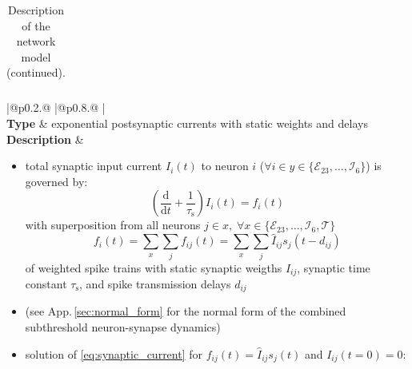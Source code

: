 \documentclass[10pt,a4paper,twoside,american]{article}
\theoremstyle{definitionstyle}
\newcommand{\diff}{\ensuremath{\text{d}}}
\newcommand{\tauS}{\tau_\text{s}}
\begin{document}
\begin{table}[H]
\begin{tabular}{
  |@{\hspace*{\marg}}p{}@{\hspace*{\marg}}
  |@{\hspace*{\marg}}p{}@{\hspace*{\marg}}
  |}
\end{tabular}
\caption{Description of the network model (continued).}
\label{tab:model_description_2}
\end{table}
\clearpage
\begin{table}[H]
\begin{tabular}{
  |@{\hspace*{\marg}}p{}@{\hspace*{\marg}}
  |@{\hspace*{\marg}}p{}@{\hspace*{\marg}}
  |}
  \hline 
  \\
  \hline 
  \textbf{Type} & exponential postsynaptic currents with static weights and delays \\
  \hline 
  \textbf{Description} &
  \begin{itemize}
	\item total synaptic input current $I_i(t)$ to neuron $i$ ($\forall i \in y\in\{\mathcal{E}_{23},\ldots,\mathcal{I}_{6}\}$) is governed by:
		\begin{equation}
			\label{eq:synaptic_current}
			\left(\frac{\diff}{\diff t} + \frac{1}{\tauS}\right) I_{i} (t) = f_{i}(t)
		\end{equation}
		with superposition from all neurons $j \in x,\;\forall x\in\{\mathcal{E}_{23},\ldots,\mathcal{I}_{6}, \mathcal{T}\}$
		\begin{equation}
			f_{i} (t) = \sum_{x} \sum_{j} f_{ij} (t) = \sum_{x} \sum_{j} \hat{I}_{ij} s_{j}(t-d_{ij})
		\end{equation}
                of weighted spike trains with static synaptic weigths $\hat{I}_{ij}$, synaptic time constant $\tauS$, and spike transmission delays $d_{ij}$
        \item[] (see App.\,\ref{sec:normal_form} for the normal form of the combined subthreshold neuron-synapse dynamics)	
	\item solution of \eqref{eq:synaptic_current} for $\displaystyle f_{ij}(t)=\hat{I}_{ij}s_{j}(t)$ and $I_{ij}(t=0)=0$:

\end{itemize}
\end{tabular}
\end{table}
\end{document}
